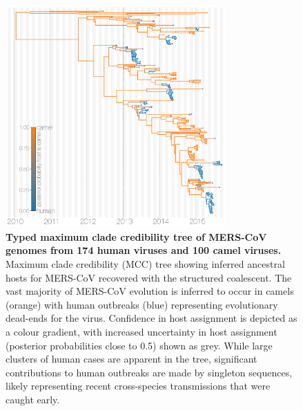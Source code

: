 \documentclass[9pt,lineno]{elife}
\begin{document}
\begin{figure}[h]
 \centering
	\includegraphics[width=0.75\textwidth]{figures/figure 1.png}
	\caption{\textbf{Typed maximum clade credibility tree of MERS-CoV genomes from 174 human viruses and 100 camel viruses.}
	Maximum clade credibility (MCC) tree showing inferred ancestral hosts for MERS-CoV recovered with the structured coalescent.
	The vast majority of MERS-CoV evolution is inferred to occur in camels (orange) with human outbreaks (blue) representing evolutionary dead-ends for the virus.
  Confidence in host assignment is depicted as a colour gradient, with increased uncertainty in host assignment (posterior probabilities close to 0.5) shown as grey.
	While large clusters of human cases are apparent in the tree, significant contributions to human outbreaks are made by singleton sequences, likely representing recent cross-species transmissions that were caught early.
	}
	\label{mcc}


\end{figure}
\end{document}

